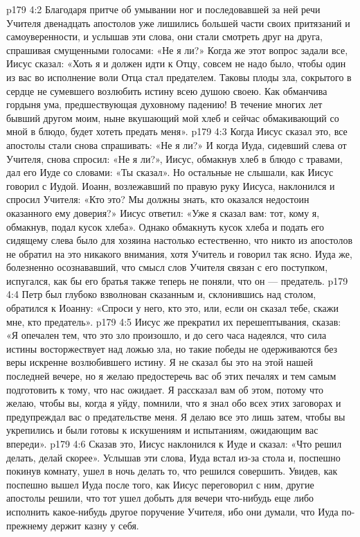 \vs p179 4:2 Благодаря притче об умывании ног и последовавшей за ней речи Учителя двенадцать апостолов уже лишились большей части своих притязаний и самоуверенности, и услышав эти слова, они стали смотреть друг на друга, спрашивая смущенными голосами: «Не я ли?» Когда же этот вопрос задали все, Иисус сказал: «Хоть я и должен идти к Отцу, совсем не надо было, чтобы один из вас во исполнение воли Отца стал предателем. Таковы плоды зла, сокрытого в сердце не сумевшего возлюбить истину всею душою своею. Как обманчива гордыня ума, предшествующая духовному падению! В течение многих лет бывший другом моим, ныне вкушающий мой хлеб и сейчас обмакивающий со мной в блюдо, будет хотеть предать меня».
\vs p179 4:3 Когда Иисус сказал это, все апостолы стали снова спрашивать: «Не я ли?» И когда Иуда, сидевший слева от Учителя, снова спросил: «Не я ли?», Иисус, обмакнув хлеб в блюдо с травами, дал его Иуде со словами: «Ты сказал». Но остальные не слышали, как Иисус говорил с Иудой. Иоанн, возлежавший по правую руку Иисуса, наклонился и спросил Учителя: «Кто это? Мы должны знать, кто оказался недостоин оказанного ему доверия?» Иисус ответил: «Уже я сказал вам: тот, кому я, обмакнув, подал кусок хлеба». Однако обмакнуть кусок хлеба и подать его сидящему слева было для хозяина настолько естественно, что никто из апостолов не обратил на это никакого внимания, хотя Учитель и говорил так ясно. Иуда же, болезненно осознававший, что смысл слов Учителя связан с его поступком, испугался, как бы его братья также теперь не поняли, что он --- предатель.
\vs p179 4:4 Петр был глубоко взволнован сказанным и, склонившись над столом, обратился к Иоанну: «Спроси у него, кто это, или, если он сказал тебе, скажи мне, кто предатель».
\vs p179 4:5 Иисус же прекратил их перешептывания, сказав: «Я опечален тем, что это зло произошло, и до сего часа надеялся, что сила истины восторжествует над ложью зла, но такие победы не одерживаются без веры искренне возлюбившего истину. Я не сказал бы это на этой нашей последней вечере, но я желаю предостеречь вас об этих печалях и тем самым подготовить к тому, что нас ожидает. Я рассказал вам об этом, потому что желаю, чтобы вы, когда я уйду, помнили, что я знал обо всех этих заговорах и предупреждал вас о предательстве меня. Я делаю все это лишь затем, чтобы вы укрепились и были готовы к искушениям и испытаниям, ожидающим вас впереди».
\vs p179 4:6 Сказав это, Иисус наклонился к Иуде и сказал: «Что решил делать, делай скорее». Услышав эти слова, Иуда встал из\hyp{}за стола и, поспешно покинув комнату, ушел в ночь делать то, что решился совершить. Увидев, как поспешно вышел Иуда после того, как Иисус переговорил с ним, другие апостолы решили, что тот ушел добыть для вечери что\hyp{}нибудь еще либо исполнить какое\hyp{}нибудь другое поручение Учителя, ибо они думали, что Иуда по\hyp{}прежнему держит казну у себя.
